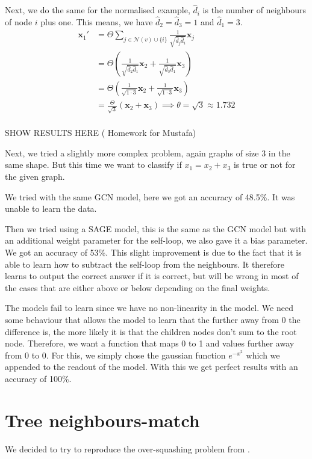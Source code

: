 \documentclass[a4paper,12pt]{article}
\begin{document}
Next, we do the same for the normalised example, $\hat{d}_{i}$ is the number of neighbours of node $i$ plus one. This means, we have $\hat{d}_{2} = \hat{d}_{3} = 1$ and $\hat{d}_{1}=3$.
\begin{align}
  \mathbf{x}_1' &= \Theta \sum_{j \in \mathcal{N}(v) \cup \{i\}} \frac{1}{\sqrt{\hat{d}_j \hat{d}_i}} \mathbf{x}_j\\
  &= \Theta  \left( \frac{1}{\sqrt{\hat{d}_2 \hat{d}_1}} \mathbf{x}_2 +  \frac{1}{\sqrt{\hat{d}_3 \hat{d}_1}} \mathbf{x}_3 \right)\\
  &= \Theta  \left( \frac{1}{\sqrt{1 \cdot 3}} \mathbf{x}_2 +  \frac{1}{\sqrt{1 \cdot 3}} \mathbf{x}_3 \right)\\
  &= \frac{\Theta}{\sqrt{3}}  \left(  \mathbf{x}_2 +   \mathbf{x}_3 \right) \implies \theta = \sqrt{3} \approx 1.732\\
\end{align}

SHOW RESULTS HERE (
Homework for Mustafa)

Next, we tried a slightly more complex problem, again graphs of size 3 in the same shape. But this time we want to classify if $x_{1} = x_{2}+x_{3}$ is true or not for the given graph.

We tried with the same GCN model, here we got an accuracy of 48.5\%. It was unable to
learn the data.

Then we tried using a SAGE model, this is the same as the GCN model but with 
an additional weight parameter for the self-loop, we also gave it a bias parameter. We got an accuracy of 53\%.
This slight improvement is due to the fact that it is able to learn how to subtract the self-loop from the neighbours. It therefore learns to output the correct answer if it is correct, but will be wrong in most of the cases that are either above or below depending on the final weights.

The models fail to learn since we have no non-linearity in the model. We need some behaviour
that allows the model to learn that the further away from 0 the difference is,
the more likely it is that the children nodes don't sum to the root node.
Therefore, we want a function that maps 0 to 1 and values further away from 0 to 0. 
For this, we simply chose the gaussian function \(e^{-x^2}\) which we
appended to the readout of the model. With this we get perfect results with an
accuracy of 100\%.





\section{Tree neighbours-match}
We decided to try to reproduce the over-squashing problem from \cite{alon_bottleneck_2021}.
\end{document}
